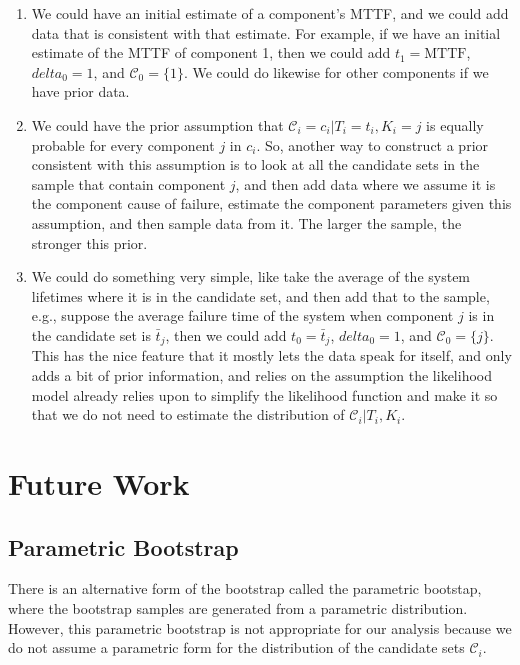 \documentclass[
]{article}
\begin{document}
\begin{enumerate}
\def\labelenumi{\arabic{enumi}.}
\item
  We could have an initial estimate of a component's MTTF, and we could
  add data that is consistent with that estimate. For example, if we
  have an initial estimate of the MTTF of component 1, then we could add
  \(t_1 = \text{MTTF}\), \(delta_0 = 1\), and \(\mathcal{C}_0 = \{1\}\).
  We could do likewise for other components if we have prior data.
\item
  We could have the prior assumption that
  \(\mathcal{C}_i = c_i | T_i = t_i, K_i = j\) is equally probable for
  every component \(j\) in \(c_i\). So, another way to construct a prior
  consistent with this assumption is to look at all the candidate sets
  in the sample that contain component \(j\), and then add data where we
  assume it is the component cause of failure, estimate the component
  parameters given this assumption, and then sample data from it. The
  larger the sample, the stronger this prior.
\item
  We could do something very simple, like take the average of the system
  lifetimes where it is in the candidate set, and then add that to the
  sample, e.g., suppose the average failure time of the system when
  component \(j\) is in the candidate set is \(\bar{t}_j\), then we
  could add \(t_0 = \bar{t}_j\), \(delta_0 = 1\), and
  \(\mathcal{C}_0 = \{j\}\). This has the nice feature that it mostly
  lets the data speak for itself, and only adds a bit of prior
  information, and relies on the assumption the likelihood model already
  relies upon to simplify the likelihood function and make it so that we
  do not need to estimate the distribution of
  \(\mathcal{C}_i | T_i, K_i\).
\end{enumerate}

\hypertarget{future-work}{%
\section{Future Work}\label{future-work}}

\hypertarget{parametric-bootstrap}{%
\subsection{Parametric Bootstrap}\label{parametric-bootstrap}}

There is an alternative form of the bootstrap called the parametric
bootstap, where the bootstrap samples are generated from a parametric
distribution. However, this parametric bootstrap is not appropriate for
our analysis because we do not assume a parametric form for the
distribution of the candidate sets \(\mathcal{C}_i\).
\end{document}
